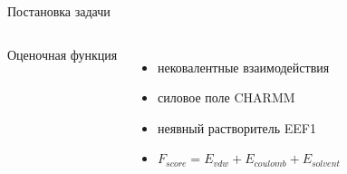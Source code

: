 \documentclass[sans,aspectratio=169]{beamer}
\begin{document}
\begin{frame}{Постановка задачи}
\begin{columns}[c]
	
	
	\vspace{18pt}
	
	Оценочная функция
	\begin{itemize}
		\setlength\itemsep{1mm} 
		\item нековалентные взаимодействия
		\item силовое поле CHARMM
		\item неявный растворитель EEF1
		\item $F_{score} = E_{vdw} + E_{coulomb} + E_{solvent}$
	\end{itemize}

\end{columns}

\end{frame}
\end{document}
